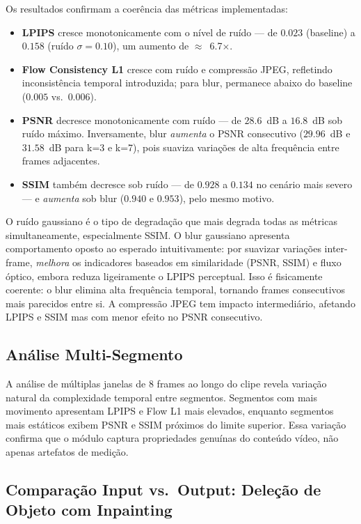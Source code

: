 \documentclass[conference]{IEEEtran}
\begin{document}
Os resultados confirmam a coerência das métricas implementadas:
\begin{itemize}
    \item \textbf{LPIPS} cresce monotonicamente com o nível de ruído — de $0.023$ (baseline) a $0.158$ (ruído $\sigma=0.10$), um aumento de $\approx$~6.7$\times$.
    \item \textbf{Flow Consistency L1} cresce com ruído e compressão JPEG, refletindo inconsistência temporal introduzida; para blur, permanece abaixo do baseline ($0.005$ vs.\ $0.006$).
    \item \textbf{PSNR} decresce monotonicamente com ruído — de $28.6$~dB a $16.8$~dB sob ruído máximo. Inversamente, blur \emph{aumenta} o PSNR consecutivo ($29.96$~dB e $31.58$~dB para k=3 e k=7), pois suaviza variações de alta frequência entre frames adjacentes.
    \item \textbf{SSIM} também decresce sob ruído — de $0.928$ a $0.134$ no cenário mais severo — e \emph{aumenta} sob blur ($0.940$ e $0.953$), pelo mesmo motivo.
\end{itemize}

O ruído gaussiano é o tipo de degradação que mais degrada todas as métricas simultaneamente, especialmente SSIM. O blur gaussiano apresenta comportamento oposto ao esperado intuitivamente: por suavizar variações inter-frame, \emph{melhora} os indicadores baseados em similaridade (PSNR, SSIM) e fluxo óptico, embora reduza ligeiramente o LPIPS perceptual. Isso é fisicamente coerente: o blur elimina alta frequência temporal, tornando frames consecutivos mais parecidos entre si. A compressão JPEG tem impacto intermediário, afetando LPIPS e SSIM mas com menor efeito no PSNR consecutivo.

\subsection{Análise Multi-Segmento}

A análise de múltiplas janelas de 8 frames ao longo do clipe revela variação natural da complexidade temporal entre segmentos. Segmentos com mais movimento apresentam LPIPS e Flow L1 mais elevados, enquanto segmentos mais estáticos exibem PSNR e SSIM próximos do limite superior. Essa variação confirma que o módulo captura propriedades genuínas do conteúdo vídeo, não apenas artefatos de medição.

\subsection{Comparação Input vs.\ Output: Deleção de Objeto com Inpainting}
\end{document}
